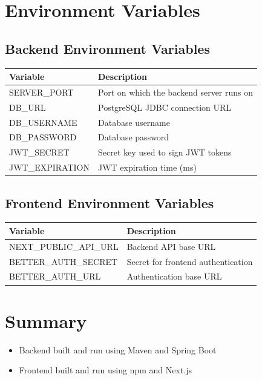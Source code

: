 \documentclass[a4paper,11pt]{article}
\begin{document}
\section{Environment Variables}

\subsection{Backend Environment Variables}

\begin{longtable}{|p{4cm}|p{7cm}|}
\hline
\textbf{Variable} & \textbf{Description} \\
\hline
SERVER\_PORT & Port on which the backend server runs on \\
DB\_URL & PostgreSQL JDBC connection URL \\
DB\_USERNAME & Database username \\
DB\_PASSWORD & Database password \\
JWT\_SECRET & Secret key used to sign JWT tokens \\
JWT\_EXPIRATION & JWT expiration time (ms) \\
\hline
\end{longtable}

\subsection{Frontend Environment Variables}

\begin{longtable}{|p{5cm}|p{6cm}|}
\hline
\textbf{Variable} & \textbf{Description} \\
\hline
NEXT\_PUBLIC\_API\_URL & Backend API base URL \\
BETTER\_AUTH\_SECRET & Secret for frontend authentication \\
BETTER\_AUTH\_URL & Authentication base URL \\
\hline
\end{longtable}

\section{Summary}

\begin{itemize}
    \item Backend built and run using Maven and Spring Boot
    \item Frontend built and run using npm and Next.js
\end{itemize}
\end{document}
